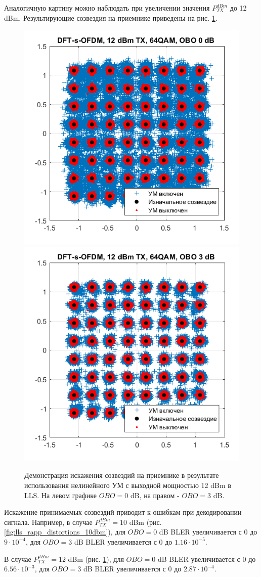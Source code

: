 Аналогичную картину можно наблюдать при увеличении значения
$P^{dBm}_{TX}$ до 12 dBm. Результирующие созвездия на приемнике приведены
на рис. \ref{fig:lls_rapp_distortions_12dbm}. 

\begin{figure}[h!]
    \centering
    \includegraphics[width=0.49\linewidth]{figs/dfts_12dbm_obo0.png}
    \includegraphics[width=0.49\linewidth]{figs/dfts_12dbm_obo3.png}
    \caption{Демонстрация искажения созвездий на приемнике в результате
    использования нелинейного УМ с выходной мощностью 12 dBm в LLS. На левом
    графике $OBO=0$ dB, на правом - $OBO=3$ dB.}
    \label{fig:lls_rapp_distortions_12dbm}
\end{figure}

Искажение принимаемых созвездий приводит к ошибкам при декодировании
сигнала. Например, в случае $P^{dBm}_{TX}=10$ dBm
(рис. \ref{fig:lls_rapp_distortions_10dbm}), для $OBO=0$ dB BLER
увеличивается с 0 до $9\cdot 10^{-4}$, для $OBO=3$ dB BLER
увеличивается с 0 до $1.16\cdot 10^{-5}$. 

В случае $P^{dBm}_{TX}=12$ dBm
(рис. \ref{fig:lls_rapp_distortions_12dbm}), для $OBO=0$ dB BLER
увеличивается с 0 до $6.56\cdot 10^{-3}$, для $OBO=3$ dB BLER
увеличивается с 0 до $2.87\cdot 10^{-4}$. 

